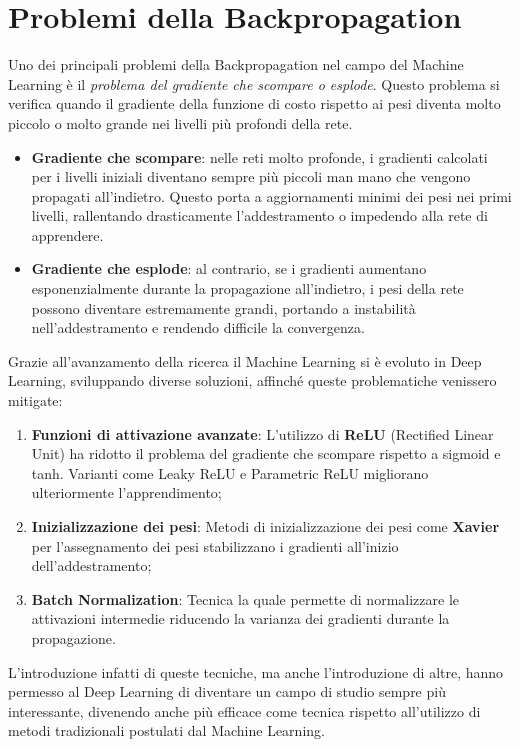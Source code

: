 \section{Problemi della Backpropagation}
Uno dei principali problemi della Backpropagation nel campo del Machine Learning è il \textit{problema del gradiente che scompare o esplode}. Questo problema si verifica quando il gradiente della funzione di costo rispetto ai pesi diventa molto piccolo o molto grande nei livelli più profondi della rete.

\begin{itemize}
    \item \textbf{Gradiente che scompare}: nelle reti molto profonde, i gradienti calcolati per i livelli iniziali diventano sempre più piccoli man mano che vengono propagati all'indietro. Questo porta a aggiornamenti minimi dei pesi nei primi livelli, rallentando drasticamente l'addestramento o impedendo alla rete di apprendere.
    \item \textbf{Gradiente che esplode}: al contrario, se i gradienti aumentano esponenzialmente durante la propagazione all'indietro, i pesi della rete possono diventare estremamente grandi, portando a instabilità nell'addestramento e rendendo difficile la convergenza.
\end{itemize}

Grazie all'avanzamento della ricerca il Machine Learning si è evoluto in Deep Learning, sviluppando diverse soluzioni, affinché queste problematiche venissero mitigate:

\begin{enumerate}
    \item \textbf{Funzioni di attivazione avanzate}: L'utilizzo di \textbf{ReLU} (Rectified Linear Unit) ha ridotto il problema del gradiente che scompare rispetto a sigmoid e tanh. Varianti come Leaky ReLU e Parametric ReLU migliorano ulteriormente l'apprendimento;
    \item \textbf{Inizializzazione dei pesi}: Metodi di inizializzazione dei pesi come \textbf{Xavier} per l'assegnamento dei pesi stabilizzano i gradienti all'inizio dell'addestramento;
    \item \textbf{Batch Normalization}: Tecnica la quale permette di normalizzare le attivazioni intermedie riducendo la varianza dei gradienti durante la propagazione.
\end{enumerate}

L'introduzione infatti di queste tecniche, ma anche l'introduzione di altre, hanno permesso al Deep Learning di diventare un campo di studio sempre più interessante, divenendo anche più efficace come tecnica rispetto all'utilizzo di metodi tradizionali postulati dal Machine Learning.

